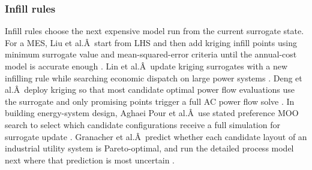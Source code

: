 \documentclass[final,5p,times,twocolumn]{elsarticle}
\begin{document}
\subsubsection{Infill rules}

Infill rules choose the next expensive model run from the current
surrogate state. For a MES, Liu et al.Â~start from LHS and then add
kriging infill points using minimum surrogate value and
mean-squared-error criteria until the annual-cost model is accurate
enough \cite{Liu201914569}. Lin et al.Â~update kriging surrogates with a new
infilling rule while searching economic dispatch on large power systems
\cite{Lin2023}. Deng et al.Â~deploy kriging so that most candidate optimal
power flow evaluations use the surrogate and only promising points
trigger a full AC power flow solve \cite{Deng2020831}. In building
energy-system design, Aghaei Pour et al.Â~use stated preference MOO
search to select which candidate configurations receive a full
simulation for surrogate update \cite{Aghaei Pour2022303}. Granacher et
al.Â~predict whether each candidate layout of an industrial utility
system is Pareto-optimal, and run the detailed process model next where
that prediction is most uncertain \cite{Granacher20221573}.
\end{document}
